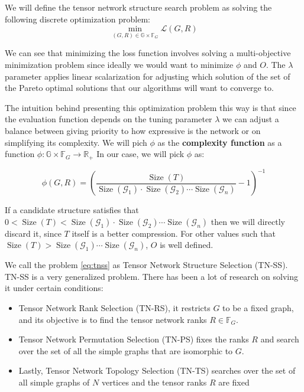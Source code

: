 \documentclass[11pt,a4paper,openright,oneside]{book}
\numberwithin{equation}{section}
\DeclareMathOperator{\size}{Size}
\begin{document}
{We will define the tensor network structure search problem as solving the following discrete optimization problem:
\begin{equation}
    \min_{(G, R) \in \mathbb{G} \times \mathbb{F}_G} \mathcal{L}(G, R)
\label{eq:tnss}
\end{equation}

We can see that minimizing the loss function involves solving a multi-objective minimization problem
since ideally we would want to minimize $\phi$ and $O$. The $\lambda$ parameter applies linear scalarization
for adjusting which solution of the set of the Pareto optimal solutions that our algorithms will want to converge to.

The intuition behind presenting this optimization problem this way is that since the evaluation function depends on the tuning parameter $\lambda$
we can adjust a balance between giving priority to how expressive is the network or on 
simplifying its complexity. We will pich $\phi$ as the \textbf{complexity function} as a function $\phi : \mathbb{G} \times \mathbb{F}_G \rightarrow \mathbb{R}_+$
In our case, we will pick $\phi$ as:

$$\phi(G, R) = \left(\frac{\size(T)}{\size(\mathcal{G}_1) \cdot \size(\mathcal{G}_2) \cdots \size(\mathcal{G}_n)} - 1\right)^{-1}$$

If a candidate structure satisfies that $0 < \size(T) < \size(\mathcal{G}_1) \cdot \size(\mathcal{G}_2) \cdots \size(\mathcal{G}_n)$
then we will directly discard it, since $T$ itself is a better compression. For other values such that $\size(T) > \size(\mathcal{G}_1) \cdots \size(\mathcal{G}_n)$, $O$ is
well defined.

We call the problem \ref{eq:tnss} as Tensor Network Structure Selection (\gls{TN-SS}). TN-SS is a very generalized problem.
There has been a lot of research on solving it under certain conditions:
\begin{itemize}
    \item Tensor Network Rank Selection (\gls{TN-RS}), it restricts $G$ to be a fixed graph, and its objective is to find the
tensor network ranks $R \in \mathbb{F}_G$.
\item Tensor Network Permutation Selection (\gls{TN-PS}) fixes the ranks $R$ and search over the set
of all the simple graphs that are isomorphic to $G$.
\item Lastly, Tensor Network Topology Selection (\gls{TN-TS}) searches over the set of all simple graphs of $N$ vertices and
        the tensor ranks $R$ are fixed
\end{itemize}

}
\end{document}
